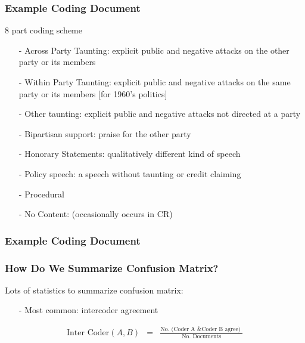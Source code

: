 \documentclass{beamer}
\numberwithin{equation}{section}
\begin{document}
\begin{frame}
\frametitle{Example Coding Document}


8 part coding scheme
\begin{itemize}
\item[-] \alert{Across Party Taunting}: explicit public and negative attacks on the other party or its members
\item[-] \alert{Within Party Taunting}: explicit public and negative attacks on the same party or its members [for 1960's politics]
\item[-] \alert{Other taunting}: explicit public and negative attacks not directed at a party
\item[-] \alert{Bipartisan support}: praise for the other party
\item[-] \alert{Honorary Statements}: qualitatively different kind of speech
\item[-] \alert{Policy speech}: a speech without taunting or credit claiming
\item[-] \alert{Procedural}
\item[-] \alert{No Content}: (occasionally occurs in CR)
\end{itemize}


\end{frame}



\begin{frame}
\frametitle{Example Coding Document}






\end{frame}



\begin{frame}
\frametitle{How Do We Summarize Confusion Matrix?}

Lots of statistics to summarize confusion matrix:
\begin{itemize}
\item[-] \alert{Most common}: intercoder agreement
\end{itemize}

\begin{eqnarray}
\text{Inter Coder}(A, B) & = & \frac{\text{No. (Coder A \& Coder B agree) }  } { \text{No. Documents}  } \nonumber
\end{eqnarray}


\end{frame}
\end{document}
